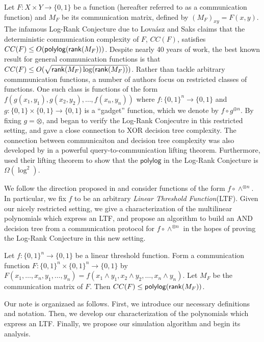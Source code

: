 Let $F: X\times Y\to \{0,1\}$ be a function (hereafter referred to as a communication function) and $M_F$ be its communication matrix, defined by $(M_F)_{xy} = F(x,y)$. The infamous Log-Rank Conjecture due to Lova\'{a}sz and Saks \cite{Lovasz1988} claims that the deterministic communication complexity of $F$, $CC(F)$, satisfies $CC(F) \leq O(\mathsf{polylog}(\mathsf{rank}(M_F)))$. Despite nearly 40 years of work, the best known result for general communication functions is that $CC(F) \leq O(\sqrt{\mathsf{rank}(M_F)\log(\mathsf{rank}(M_F))})$. Rather than tackle arbitrary commmunication functions, a number of authors focus on restricted classes of functions. One such class is functions of the form $f(g(x_1,y_1),g(x_2,y_2),\dots,f(x_n,y_n))$ where $f : \{0,1\}^n \to \{0,1\}$ and $g : \{0,1\}\times\{0,1\}\to\{0,1\}$ is a ``gadget'' function, which we denote by $f \circ g^{\oplus n}$. By fixing $g = \otimes$, \cite{Tsang2013} and \cite{Lovett2016} began to verify the Log-Rank Conjecutre in this restricted setting, and gave a close connection to XOR decision tree complexity. The connection between communicaiton and decision tree complexity was also developed by \cite{Goos2015} in a powerful query-to-communication lifting theorem. Furthermore, \cite{Goos2015} used their lifting theorem to show that the $\mathsf{polylog}$ in the Log-Rank Conjecture is $\Omega(\log^2)$.

We follow the direction proposed in \cite{Lovett2016} and consider functions of the form $f\circ \wedge^{\otimes n}$. In particular, we fix $f$ to be an arbitrary \textit{Linear Threshold Function}(LTF). Given our nicely restricted setting, we give a characterization of the multilinear polynomials which express an LTF, and propose an algorithm to build an AND decision tree from a communication protocol for $f\circ \wedge^{\otimes n}$ in the hopes of proving the Log-Rank Conjecture in this new setting. 
\begin{theorem}\label{mainresult}
	Let $f : \{0,1\}^n\to\{0,1\}$ be a linear threshold function. Form a communication function $F: \{0,1\}^n\times \{0,1\}^n\to\{0,1\}$ by $F(x_1,\dots,x_n,y_1,\dots,y_n)  = f(x_1 \wedge y_1,x_2\wedge y_2,\dots,x_n\wedge y_n)$. Let  $M_F$ be the communication matrix of $F$. Then $CC(F) \leq \mathsf{polylog}(\mathsf{rank}(M_F))$. 
\end{theorem}

Our note is organizaed as follows. First, we introduce our necessary definitions and notation. Then, we develop our characterization of the polynomials which express an LTF. Finally, we propose our simulation algorithm and begin its analysis. 